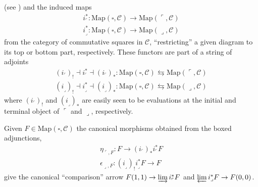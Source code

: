 \documentclass[11pt, a4paper]{amsart}
\renewcommand{\C}{\mathcal{C}}
\begin{document}
(see \cite[Notation \textbf{1.2.8.4}]{HTT}) and the induced maps
\begin{gather}
i_\ulcorner^*\colon \text{Map}(\square, \C) \to \text{Map}(\ulcorner,\C)\\
i_\lrcorner^*\colon \text{Map}(\square, \C) \to \text{Map}(\lrcorner,\C)
\end{gather}
from the category of commutative squares in $\C$, ``restricting'' a given diagram to its top or bottom part, respectively. These functors are part of a string of adjoints
\begin{gather}
(i_\ulcorner)_! \dashv \boxed{i_\ulcorner^* \dashv (i_\ulcorner)_*}\colon \text{Map}(\square,\C)\leftrightarrows \text{Map}(\ulcorner,\C)\\
\boxed{(i_\lrcorner)_! \dashv i_\lrcorner^*} \dashv (i_\lrcorner)_*\colon \text{Map}(\square,\C)\leftrightarrows \text{Map}(\lrcorner,\C)
\end{gather}
where $(i_\ulcorner)_!$ and $(i_\lrcorner)_*$ are easily seen to be evaluations at the initial and terminal object of $\ulcorner$ and $\lrcorner$, respectively. 

Given $F\in \text{Map}(\square, \C)$ the canonical morphisms obtained from the boxed adjunctions,
\begin{gather*}
\eta_{\ulcorner, F}\colon F\to (i_\ulcorner)_*i_\ulcorner^* F\\
\epsilon_{\lrcorner, F}\colon (i_\lrcorner)_!  i_\lrcorner^*F\to F
\end{gather*}
give the canonical ``comparison'' arrow $F(1,1) \to \varinjlim i_\ulcorner^* F$ and $\varprojlim i_\lrcorner^*F\to F(0,0)$.
\end{document}
